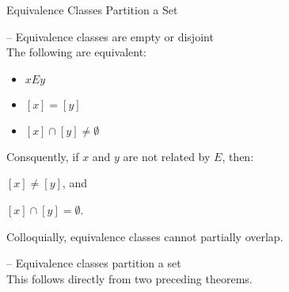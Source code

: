 \begin{slide}[bm=,toc=]{Equivalence Classes Partition a Set}
\begin{thm}{ -- Equivalence classes are empty or disjoint}~\\
The following are equivalent:
\begin{itemize}
\item $xEy$ 
\item $[x] = [y]$ 
\item $[x] \cap [y] \neq \emptyset$ 
\end{itemize}
Consquently, if $x$ and $y$ are not related by $E$, then:
\item $[x] \neq [y]$, and
\item $[x] \cap [y] = \emptyset$.
\end{thm}
Colloquially, equivalence classes cannot partially overlap. 
\vspace{5mm}
\begin{thm}{ -- Equivalence classes partition a set}~\\
This follows directly from two preceding theorems. 
\end{thm}
\end{slide}





